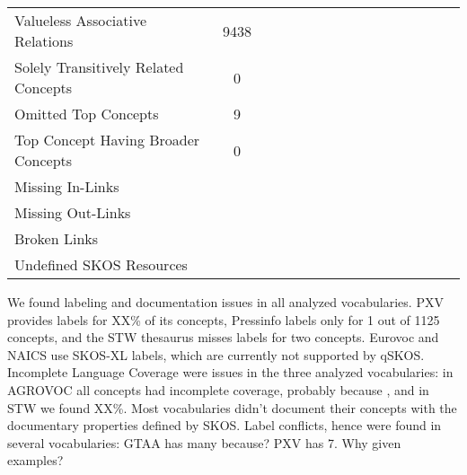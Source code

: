 \begin{table}[h]
\begin{tabular}{p{4cm}ccccccccccccccc}
Valueless Associative Relations & 9438 &&&&&&&&&&&&&& \\

Solely Transitively Related Concepts & 0 &&&&&&&&&&&&&& \\

Omitted Top Concepts & 9 &&&&&&&&&&&&&& \\

Top Concept Having Broader Concepts & 0 &&&&&&&&&&&&&& \\

\midrule

Missing In-Links &&&&&&&&&&&&&&& \\

Missing Out-Links &&&&&&&&&&&&&&& \\

Broken Links &&&&&&&&&&&&&&& \\


Undefined SKOS Resources &&&&&&&&&&&&&&& \\

\bottomrule
\end{tabular}
\end{table}

We found labeling and documentation issues in all analyzed vocabularies. PXV provides labels for XX\% of its concepts, Pressinfo labels only for 1 out of 1125 concepts, and the STW thesaurus misses labels for two concepts. Eurovoc and NAICS use SKOS-XL labels, which are currently not supported by qSKOS.
Incomplete Language Coverage were issues in the three analyzed vocabularies: in AGROVOC all concepts had incomplete coverage, probably because , and in STW we found XX\%.
Most vocabularies didn't document their concepts with the documentary properties defined by SKOS.
Label conflicts, hence  were found in several vocabularies: GTAA has many because? PXV has 7. Why given examples?





% 

